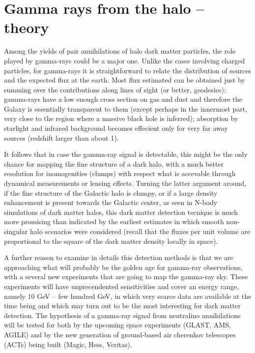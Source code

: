 
\section{Gamma rays from the halo -- theory}
\label{section_hr}

Among the yields of pair annihilations of halo dark matter particles,
the role played by gamma-rays could be a major one. Unlike the cases
involving charged particles, for gamma-rays it is straightforward
to relate the distribution of sources and the expected flux
at the earth. Most flux estimated can be obtained just by summing
over the contributions along 
lines of sight (or better, geodesics): gamma-rays have a low 
enough cross section on gas and dust and therefore the Galaxy is 
essentially transparent to them (except perhaps in the innermost part, 
very close to the region where a massive black hole is inferred); 
absorption by starlight and infrared background becomes effecient
only for very far away sources (redshift larger than about 1).

It follows that in case the gamma-ray signal is detectable, 
this might be the only chance for mapping the fine structure of a dark 
halo, with a much better resolution for inomogenities (clumps) with 
respect what is accevable through dynamical measurements or lensing effects. 
Turning the latter argument around, if the fine structure of the Galactic 
halo is clumpy, or if a large density enhancement is present towards the 
Galactic center, as seen in N-body simulations of dark matter halos,
this dark matter detection tecnique is much more promising than indicated 
by the earliest estimates in which smooth non-singular halo 
scenarios were considered (recall that the fluxes per unit volume are 
proportional to the square of the dark matter density locally in space).

A further reason to examine in details this detection methods is that
we are approaching what will probably be the golden age for
gamma-ray observations, with a several new experiments that are going 
to map the gamma-ray sky. These experiments will have unprecendented 
sensitivities and cover an energy range, namely 10 GeV -- few hundred GeV, 
in which very scarce data are available at the time being and which may 
turn out to be the most interesting for dark matter detection.
The hypothesis of a gamma-ray signal from neutralino annihilations 
will be tested for both by the upcoming space experiments 
(GLAST, AMS, AGILE) and by the new generation of ground-based 
air cherenkov telescopes (ACTs) being built (Magic, Hess, Veritas).

